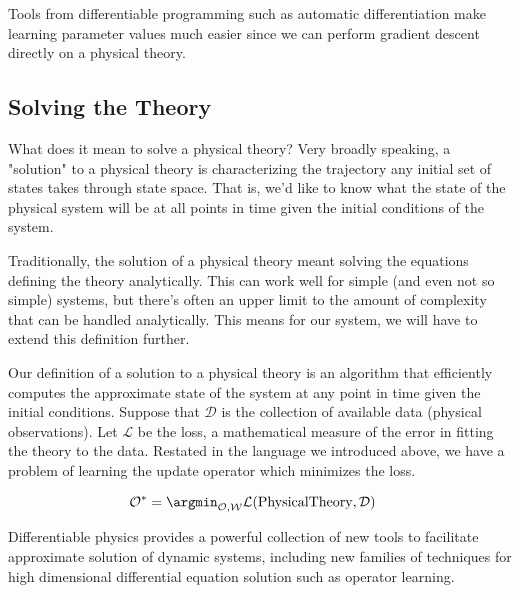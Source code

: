\documentclass[book.tex]{subfiles}
\begin{document}
Tools from differentiable programming such as automatic differentiation make learning parameter values much easier since we can perform gradient descent directly on a physical theory.


\subsection{Solving the Theory}

What does it mean to solve a physical theory? Very broadly speaking, a "solution" to a physical theory is characterizing the trajectory any initial set of states takes through state space. That is, we'd like to know what the state of the physical system will be at all points in time given the initial conditions of the system.

Traditionally, the solution of a physical theory meant solving the equations defining the theory analytically. This can work well for simple (and even not so simple) systems, but there's often an upper limit to the amount of complexity that can be handled analytically. This means for our system, we will have to extend this definition further.

Our definition of a solution to a physical theory is an algorithm that efficiently computes the approximate state of the system at any point in time given the initial conditions. Suppose that $\mathcal{D}$ is the collection of available data (physical observations). Let $\mathcal{L}$ be the loss, a mathematical measure of the error in fitting the theory to the data. Restated in the language we introduced above, we have a problem of learning the update operator which minimizes the loss.

\begin{align}
    \mathcal{O}^* &= \argmin_{\mathcal{O}, \mathcal{W}} \mathcal{L}(\textrm{PhysicalTheory}, \mathcal{D})
\end{align}

Differentiable physics provides a powerful collection of new tools to facilitate approximate solution of dynamic systems, including new families of techniques for high dimensional differential equation solution such as operator learning.

\end{document}
